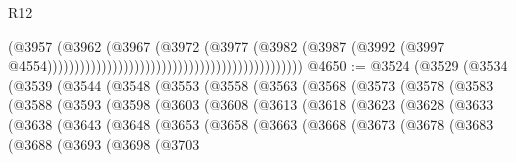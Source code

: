 \begin{lexlean}{R12}
\begin{coremodule}
                                                                                (@3957
                                                                                  (@3962
                                                                                    (@3967
                                                                                      (@3972
                                                                                        (@3977
                                                                                          (@3982
                                                                                            (@3987
                                                                                              (@3992
                                                                                                (@3997
                                                                                                  @4554)))))))))))))))))))))))))))))))))))))))))))))))
@4650 := @3524
    (@3529
      (@3534
        (@3539
          (@3544
            (@3548
              (@3553
                (@3558
                  (@3563
                    (@3568
                      (@3573
                        (@3578
                          (@3583
                            (@3588
                              (@3593
                                (@3598
                                  (@3603
                                    (@3608
                                      (@3613
                                        (@3618
                                          (@3623
                                            (@3628
                                              (@3633
                                                (@3638
                                                  (@3643
                                                    (@3648
                                                      (@3653
                                                        (@3658
                                                          (@3663
                                                            (@3668
                                                              (@3673
                                                                (@3678
                                                                  (@3683
                                                                    (@3688
                                                                      (@3693
                                                                        (@3698
                                                                          (@3703

\end{coremodule}
\end{lexlean}
